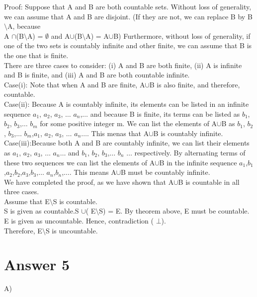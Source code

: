 \documentclass[12pt]{article}
\begin{document}
Proof: Suppose that A and B are both countable sets. Without loss of generality, we can assume that A and B are disjoint. (If they are not, we can replace B by B$\setminus$A, because\\
A $\cap$(B$\setminus$A) = $\emptyset$ and A$\cup$(B$\setminus$A) = A$\cup$B) Furthermore, without loss of generality, if one of the two sets is countably infinite and other finite, we can assume that B is the one that is finite.\\

There are three cases to consider: (i) A and B are both finite, (ii) A is infinite and B is finite, and (iii) A and B are both countable infinite.\\

Case(i): Note that when A and B are finite, A$\cup$B is also finite, and therefore, countable.\\

Case(ii): Because A is countably infinite, its elements can be listed in an infinite sequence $a_1$, $a_2$, $a_3$, $\dots$ $a_n$,$\dots$ and because B is finite, its terms can be listed as  $b_1$, $b_2$, $b_3$,$\dots$ $b_m$ for some positive integer m. We can list the elements of A$\cup$B as $b_1$, $b_2$, $b_3$,$\dots$ $b_m$,$a_1$, $a_2$, $a_3$, $\dots$ $a_n$$\dots$. This menas that A$\cup$B is countably infinite.\\

Case(iii):Because both A and B are countably infinite, we can list their elements as $a_1$, $a_2$, $a_3$, $\dots$ $a_n$$\dots$ and $b_1$, $b_2$, $b_3$,$\dots$ $b_n$ $\dots$ respectively. By alternating terms of these two sequences we can list the elements of  A$\cup$B in the infinite sequence $a_1$,$b_1$,$a_2$,$b_2$,$a_3$,$b_3$,$\dots$ $a_n$,$b_n$,$\dots$. This means A$\cup$B must be countably infinite.\\

We have completed the proof, as we have shown that A$\cup$B is countable in all three cases.\\

Assume that E$\setminus$S is countable.\\

S is given as countable.S $\cup$( E$\setminus$S) = E. By theorem above, E must be countable. E is given as uncountable. Hence, contradiction ( $\bot$).\\

Therefore,  E$\setminus$S is uncountable.\\
\section*{Answer 5}
A)\\
\end{document}
